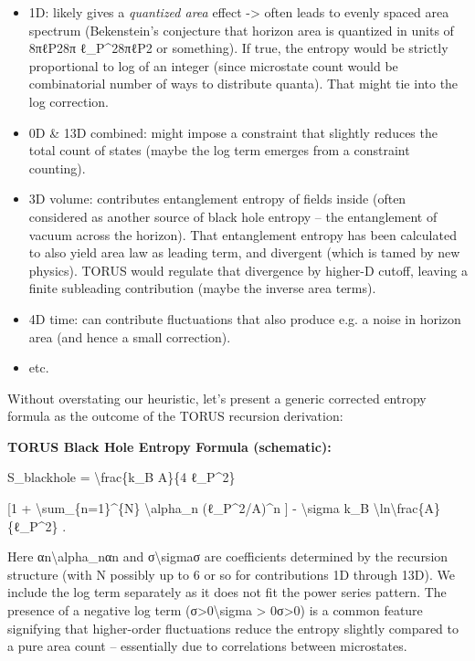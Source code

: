 \documentclass[]{article}
\begin{document}
\begin{itemize}
\item
  1D: likely gives a \emph{quantized area} effect -\textgreater{} often
  leads to evenly spaced area spectrum (Bekenstein's conjecture that
  horizon area is quantized in units of 8πℓP28π ℓ\_P\^{}28πℓP2​ or
  something). If true, the entropy would be strictly proportional to log
  of an integer (since microstate count would be combinatorial number of
  ways to distribute quanta). That might tie into the log correction.
\item
  0D \& 13D combined: might impose a constraint that slightly reduces
  the total count of states (maybe the log term emerges from a
  constraint counting).
\item
  3D volume: contributes entanglement entropy of fields inside (often
  considered as another source of black hole entropy -- the entanglement
  of vacuum across the horizon). That entanglement entropy has been
  calculated to also yield area law as leading term, and divergent
  (which is tamed by new physics). TORUS would regulate that divergence
  by higher-D cutoff, leaving a finite subleading contribution (maybe
  the inverse area terms).
\item
  4D time: can contribute fluctuations that also produce e.g. a noise in
  horizon area (and hence a small correction).
\item
  etc.
\end{itemize}

Without overstating our heuristic, let's present a generic corrected
entropy formula as the outcome of the TORUS recursion derivation:

\textbf{TORUS Black Hole Entropy Formula (schematic):}

S\_blackhole = \textbackslash{}frac\{k\_B A\}\{4 ℓ\_P\^{}2\}

{[}1 + \textbackslash{}sum\_\{n=1\}\^{}\{N\} \textbackslash{}alpha\_n
(ℓ\_P\^{}2/A)\^{}n {]} - \textbackslash{}sigma k\_B
\textbackslash{}ln\textbackslash{}frac\{A\}\{ℓ\_P\^{}2\} .

Here αn\textbackslash{}alpha\_nαn​ and σ\textbackslash{}sigmaσ are
coefficients determined by the recursion structure (with N possibly up
to 6 or so for contributions 1D through 13D). We include the log term
separately as it does not fit the power series pattern. The presence of
a negative log term (σ\textgreater{}0\textbackslash{}sigma
\textgreater{} 0σ\textgreater{}0) is a common feature signifying that
higher-order fluctuations reduce the entropy slightly compared to a pure
area count -- essentially due to correlations between microstates.
\end{document}
